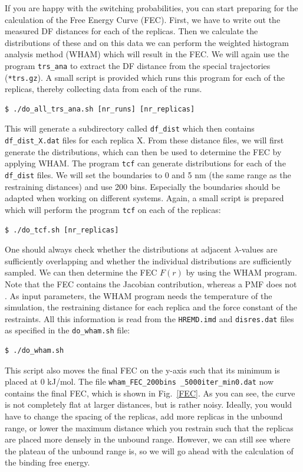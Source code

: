 If you are happy with the switching probabilities, you can start preparing for the calculation of the Free Energy Curve (FEC).
First, we have to write out the measured DF distances for each of the replicas. Then we calculate the distributions of these and on this data we can perform the weighted histogram analysis method (WHAM) which will result in the FEC.
We will again use the program \texttt{trs\_ana} to extract the DF distance from the special trajectories (\texttt{*trs.gz}). 
A small script is provided which runs this program for each of the replicas, thereby collecting data from each of the runs.

\begin{lstlisting}
$ ./do_all_trs_ana.sh [nr_runs] [nr_replicas]
\end{lstlisting}
This will generate a subdirectory called \texttt{df\_dist} which then contains \texttt{df\_dist\_X.dat} files for each replica X. 
From these distance files, we will first generate the distributions, which can then be used to determine the FEC by applying WHAM. 
The program \texttt{tcf} can generate distributions for each of the \texttt{df\_dist} files. 
We will set the boundaries to 0 and 5 nm (the same range as the restraining distances) and use 200 bins. 
Especially the boundaries should be adapted when working on different systems. 
Again, a small script is prepared which will perform the program \texttt{tcf} on each of the replicas:

\begin{lstlisting}
$ ./do_tcf.sh [nr_replicas]
\end{lstlisting}
One should always check whether the distributions at adjacent $\lambda$-values are sufficiently overlapping and whether the individual distributions are sufficiently sampled.
We can then determine the FEC $F(r)$ by using the WHAM program. 
Note that the FEC contains the Jacobian contribution, whereas a PMF does not \cite{Trzesniak_2007}. 
As input parameters, the WHAM program needs the temperature of the simulation, the restraining distance for each replica and the force constant of the restraints. 
All this information is read from the \texttt{HREMD.imd} and \texttt{disres.dat} files as specified in the \texttt{do\_wham.sh} file:
\begin{lstlisting}
$ ./do_wham.sh
\end{lstlisting}
This script also moves the final FEC on the y-axis such that its minimum is placed at 0 kJ/mol.
The file \texttt{wham\_FEC\_200bins \_5000iter\_min0.dat} now contains the final FEC, which is shown in Fig.~\ref{FEC}. As you can see, the curve is not completely flat at larger distances, but is rather noisy. Ideally, you would have to change the spacing of the replicas, add more replicas in the unbound range, or lower the maximum distance which you restrain such that the replicas are placed more densely in the unbound range. 
However, we can still see where the plateau of the unbound range is, so we will go ahead with the calculation of the binding free energy.


